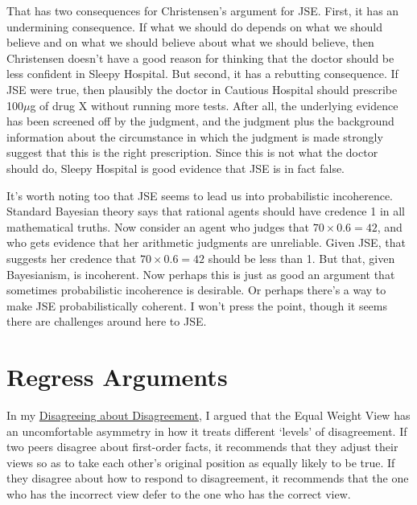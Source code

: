 That has two consequences for Christensen's argument for JSE. First, it has an undermining consequence. If what we should do depends on what we should believe and on what we should believe about what we should believe, then Christensen doesn't have a good reason for thinking that the doctor should be less confident in Sleepy Hospital. But second, it has a rebutting consequence. If JSE were true, then plausibly the doctor in Cautious Hospital should prescribe 100$\mu$g of drug X without running more tests. After all, the underlying evidence has been screened off by the judgment, and the judgment plus the background information about the circumstance in which the judgment is made strongly suggest that this is the right prescription. Since this is not what the doctor should do, Sleepy Hospital is good evidence that JSE is in fact false.

It's worth noting too that JSE seems to lead us into probabilistic incoherence. Standard Bayesian theory says that rational agents should have credence 1 in all mathematical truths. Now consider an agent who judges that \(70 \times 0.6 = 42\), and who gets evidence that her arithmetic judgments are unreliable. Given JSE, that suggests her credence that \(70 \times 0.6 = 42\) should be less than 1. But that, given Bayesianism, is incoherent. Now perhaps this is just as good an argument that sometimes probabilistic incoherence is desirable. Or perhaps there's a way to make JSE probabilistically coherent. I won't press the point, though it seems there are challenges around here to JSE.

\section{Regress Arguments}

In my \href{http://brian.weatherson.org/DaD.pdf}{Disagreeing about Disagreement}, I argued that the Equal Weight View has an uncomfortable asymmetry in how it treats different `levels' of disagreement. If two peers disagree about first-order facts, it recommends that they adjust their views so as to take each other's original position as equally likely to be true. If they disagree about how to respond to disagreement, it recommends that the one who has the incorrect view defer to the one who has the correct view.

